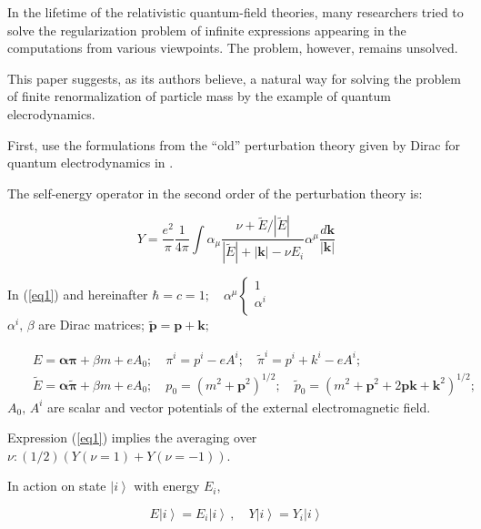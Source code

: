 \documentclass[a4paper,draft,showpacs,preprint,prd,aps]{revtex4}
\begin{document}
In the lifetime of the relativistic quantum-field theories, many researchers
tried to solve the regularization problem of infinite expressions appearing
in the computations from various viewpoints. The problem, however, remains
unsolved.

This paper suggests, as its authors believe, a natural way for solving the
problem of finite renormalization of particle mass by the example of quantum
elecrodynamics.

First, use the formulations from the ``old'' perturbation theory given by
Dirac for quantum electrodynamics in \cite{ref1}.

The self-energy operator in the second order of the perturbation theory is:

\begin{equation}
\label{eq1}
Y = \frac{e^2}\pi \frac 1{4\pi}
\int\alpha_\mu
\frac{\nu + \tilde{E}/|\tilde{E}|}{|\tilde{E}|+|{\bm k}|-\nu E_i}
\alpha^\mu \frac{d{\bm k}}{|{\bm k}|}
\end{equation}


In (\ref{eq1}) and hereinafter
$\hbar=c=1;\quad \alpha^\mu\left\{
\begin{array}{l}
1 \\
\alpha^i\\
\end{array}\right.$
\\
$\alpha^i,\, \beta$ are Dirac matrices; $\bm{\tilde{p}} = \bm{p} + \bm{k};$

\begin{eqnarray*}
&&E=\bm{\alpha}\bm{\pi} + \beta m + eA_0;\quad \pi^i = p^i - eA^i;\quad
\tilde{\pi}^i = p^i + k^i - eA^i;\\
&& \tilde {E} = \bm{\alpha} \tilde{\bm \pi} + \beta m + eA_0;  \quad
p_0 = \left(m^2 + {\bm p}^2\right)^{1/2};\quad
\tilde{p}_0 = \left(m^2 + \bm{p}^2 + 2\bm{p}\bm{k} +
{\bm k}^2 \right)^{1/2};
\end{eqnarray*}
$A_0,\, A^i$ are scalar and vector potentials of the external
electromagnetic field.

Expression (\ref{eq1}) implies the averaging over
$\nu : (1/2)\left(Y(\nu = 1) + Y(\nu = - 1)\right)$.

In action on state $\left|i\right\rangle$ with energy $E_i$,

\begin{equation}
\label{eq2}
E\left| i \right\rangle = E_{i} \left| i \right\rangle\,, \quad
Y\left| i \right\rangle = Y_{i} \left| i \right\rangle
\end{equation}
\end{document}
